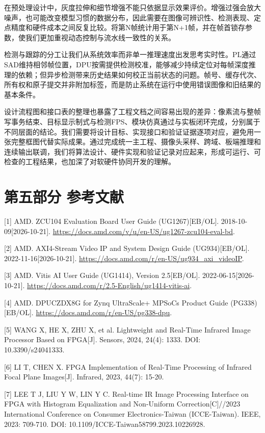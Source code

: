 \documentclass[UTF8,a4paper,12pt,fontset=windows]{ctexart}
\begin{document}
在预处理设计中，灰度拉伸和细节增强不能只依据显示效果评价。增强过强会放大噪声，也可能改变模型习惯的数据分布，因此需要在图像可辨识性、检测表现、定点精度和硬件成本之间反复比较。将第N帧统计用于第N+1帧，并在帧首锁存参数，使我们更加重视动态控制与流水线一致性的关系。

检测与跟踪的分工让我们从系统效率而非单一推理速度出发思考实时性。PL通过SAD维持相邻帧位置，DPU按需提供检测校准，能够减少持续定位对每帧深度推理的依赖；但异步检测带来历史结果如何校正当前状态的问题。帧号、缓存代次、所有权和原子提交并非附加标签，而是防止系统在运行中使用错误图像和旧结果的基本条件。

设计流程图和接口表的整理也暴露了工程文档之间容易出现的差异：像素流与整帧写事务结束、目标显示制式与检测FPS、模块仿真通过与实板闭环完成，分别属于不同层面的结论。我们需要将设计目标、实现接口和验证证据逐项对应，避免用一张完整框图代替实际成果。通过完成统一主工程、摄像头采样、跨域、板端推理和连续输出联调，我们将算法设计、硬件实现和验证记录对应起来，形成可运行、可检查的工程结果，也加深了对软硬件协同开发的理解。


\section*{第五部分 参考文献}

\begingroup
\footnotesize
\setlength{\parskip}{2pt}

[1] AMD. ZCU104 Evaluation Board User Guide (UG1267)[EB/OL]. 2018-10-09[2026-10-21]. \url{https://docs.amd.com/v/u/en-US/ug1267-zcu104-eval-bd}.

[2] AMD. AXI4-Stream Video IP and System Design Guide (UG934)[EB/OL]. 2022-11-16[2026-10-21]. \url{https://docs.amd.com/r/en-US/ug934_axi_videoIP}.

[3] AMD. Vitis AI User Guide (UG1414), Version 2.5[EB/OL]. 2022-06-15[2026-10-21]. \url{https://docs.amd.com/r/2.5-English/ug1414-vitis-ai}.

[4] AMD. DPUCZDX8G for Zynq UltraScale+ MPSoCs Product Guide (PG338)[EB/OL]. \url{https://docs.amd.com/r/en-US/pg338-dpu}.

[5] WANG X, HE X, ZHU X, et al. Lightweight and Real-Time Infrared Image Processor Based on FPGA[J]. Sensors, 2024, 24(4): 1333. DOI: 10.3390/s24041333.

[6] LI T, CHEN X. FPGA Implementation of Real-Time Processing of Infrared Focal Plane Images[J]. Infrared, 2023, 44(7): 15-20.

[7] LEE T J, LIU Y W, LIN Y C. Real-time IR Image Processing Interface on FPGA with Histogram Equalization and Non-Uniform Correction[C]//2023 International Conference on Consumer Electronics-Taiwan (ICCE-Taiwan). IEEE, 2023: 709-710. DOI: 10.1109/ICCE-Taiwan58799.2023.10226928.
\end{document}

